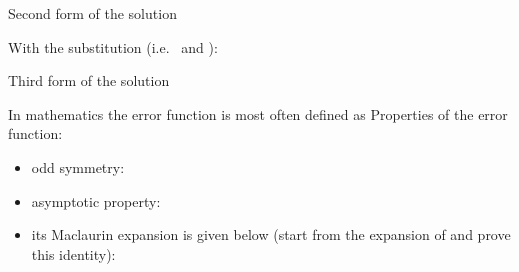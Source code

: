 \begin{EMimportant}{Second form of the solution}


\end{EMimportant}

With the substitution  (i.e.~ and ):

\begin{EMimportant}{Third form of the solution}


\end{EMimportant}

\EMhold


\begin{EMunit}

In mathematics the error function is most often defined as
Properties of the error function:

\begin{itemize}
\tightlist
\item
  odd symmetry: 
\item
  asymptotic property: 
\item
  its Maclaurin expansion is given below (start from the expansion of  and prove this identity):
\end{itemize}


\end{EMunit}


